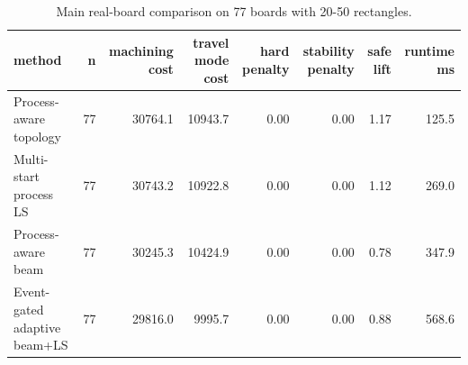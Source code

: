 \begin{table}[t]
\centering
\caption{Main real-board comparison on 77 boards with 20-50 rectangles.}
\label{tab:main-method-summary}
\begin{tabular}{lrrrrrrr}
\toprule
method & n & machining cost & travel mode cost & hard penalty & stability penalty & safe lift & runtime ms \\
\midrule
Process-aware topology & 77 & 30764.1 & 10943.7 & 0.00 & 0.00 & 1.17 & 125.5 \\
Multi-start process LS & 77 & 30743.2 & 10922.8 & 0.00 & 0.00 & 1.12 & 269.0 \\
Process-aware beam & 77 & 30245.3 & 10424.9 & 0.00 & 0.00 & 0.78 & 347.9 \\
Event-gated adaptive beam+LS & 77 & 29816.0 & 9995.7 & 0.00 & 0.00 & 0.88 & 568.6 \\
\bottomrule
\end{tabular}
\end{table}

